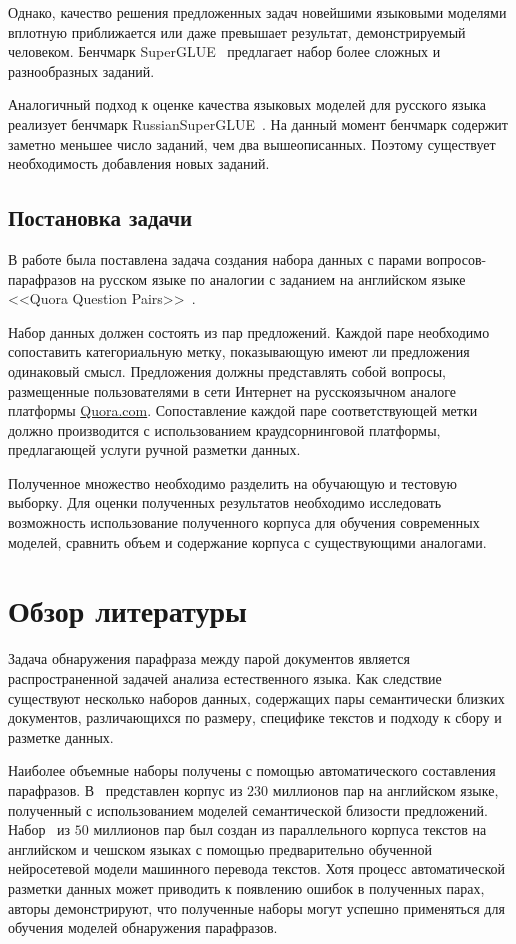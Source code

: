 \documentclass[a4paper,14pt]{extarticle}
\begin{document}
Однако, качество решения предложенных задач новейшими языковыми моделями вплотную приближается или даже превышает результат, демонстрируемый человеком.
Бенчмарк SuperGLUE~\autocite{wang2019superglue} предлагает набор более сложных и разнообразных заданий.

Аналогичный подход к оценке качества языковых моделей для русского языка реализует бенчмарк RussianSuperGLUE~\autocite{shavrina2020russiansuperglue}.
На данный момент бенчмарк содержит заметно меньшее число заданий, чем два вышеописанных.
Поэтому существует необходимость добавления новых заданий.

\subsection{Постановка задачи}

В работе была поставлена задача создания набора данных с парами вопросов-парафразов на русском языке по аналогии с заданием на английском языке {<<Quora Question Pairs>>}~\autocite{iyer_csernai_dandekar_2017}.

Набор данных должен состоять из пар предложений. Каждой паре необходимо сопоставить категориальную метку, показывающую имеют ли предложения одинаковый смысл.
Предложения должны представлять собой вопросы, размещенные пользователями в сети Интернет на русскоязычном аналоге платформы \href{https://www.quora.com/}{Quora.com}.
Сопоставление каждой паре соответствующей метки должно производится с использованием краудсорнинговой платформы, предлагающей услуги ручной разметки данных.

Полученное множество необходимо разделить на обучающую и тестовую выборку.
Для оценки полученных результатов необходимо исследовать возможность использование полученного корпуса для обучения современных моделей, сравнить объем и содержание корпуса с существующими аналогами.

\section{Обзор литературы}

Задача обнаружения парафраза между парой документов является распространенной задачей анализа естественного языка.
Как следствие существуют несколько наборов данных, содержащих пары семантически близких документов, различающихся по размеру, специфике текстов и подходу к сбору и разметке данных.

Наиболее объемные наборы получены с помощью автоматического составления парафразов.
В~\autocite{ganitkevitch2013ppdb} представлен корпус из $230$ миллионов пар на английском языке, полученный с использованием моделей семантической близости предложений.
Набор~\autocite{wieting2017paranmt} из $50$ миллионов пар был создан из параллельного корпуса текстов на английском и чешском языках с помощью предварительно обученной нейросетевой модели машинного перевода текстов.
Хотя процесс автоматической разметки данных может приводить к появлению ошибок в полученных парах, авторы демонстрируют, что полученные наборы могут успешно применяться для обучения моделей обнаружения парафразов.
\end{document}
